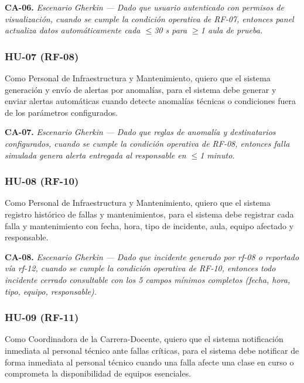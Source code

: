 \textbf{CA-06.} \textit{Escenario }\textit{Gherkin}\textit{ --- Dado que usuario autenticado con permisos de visualización, cuando se cumple la condición operativa de RF-07, entonces panel actualiza datos automáticamente cada $\leq$30 s para $\geq$1 aula de prueba.}


\subsubsection*{HU-07 (RF-08)}


Como Personal de Infraestructura y Mantenimiento, quiero que el sistema generación y envío de alertas por anomalías, para el sistema debe generar y enviar alertas automáticas cuando detecte anomalías técnicas o condiciones fuera de los parámetros configurados.


\textbf{CA-07.} \textit{Escenario }\textit{Gherkin}\textit{ --- Dado que reglas de anomalía y destinatarios configurados, cuando se cumple la condición operativa de RF-08, entonces falla simulada genera alerta entregada al responsable en $\leq$1 minuto.}


\subsubsection*{HU-08 (RF-10)}


Como Personal de Infraestructura y Mantenimiento, quiero que el sistema registro histórico de fallas y mantenimientos, para el sistema debe registrar cada falla y mantenimiento con fecha, hora, tipo de incidente, aula, equipo afectado y responsable.


\textbf{CA-08.} \textit{Escenario }\textit{Gherkin}\textit{ --- Dado que incidente generado por rf-08 o reportado vía rf-12, cuando se cumple la condición operativa de RF-10, entonces todo incidente cerrado consultable con los 5 campos mínimos completos (fecha, hora, tipo, equipo, responsable).}


\subsubsection*{HU-09 (RF-11)}


Como Coordinadora de la Carrera-Docente, quiero que el sistema notificación inmediata al personal técnico ante fallas críticas, para el sistema debe notificar de forma inmediata al personal técnico cuando una falla afecte una clase en curso o comprometa la disponibilidad de equipos esenciales.


